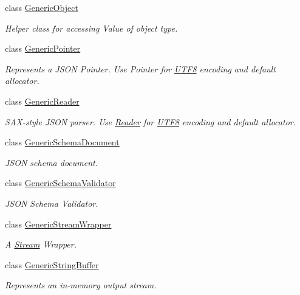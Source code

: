 \begin{DoxyCompactItemize}
class \mbox{\hyperlink{classrapidjson_1_1_generic_object}{Generic\+Object}}
\begin{DoxyCompactList}\small\item\em Helper class for accessing Value of object type. \end{DoxyCompactList}\item 
class \mbox{\hyperlink{classrapidjson_1_1_generic_pointer}{Generic\+Pointer}}
\begin{DoxyCompactList}\small\item\em Represents a J\+S\+ON Pointer. Use Pointer for \mbox{\hyperlink{structrapidjson_1_1_u_t_f8}{U\+T\+F8}} encoding and default allocator. \end{DoxyCompactList}\item 
class \mbox{\hyperlink{classrapidjson_1_1_generic_reader}{Generic\+Reader}}
\begin{DoxyCompactList}\small\item\em S\+A\+X-\/style J\+S\+ON parser. Use \mbox{\hyperlink{namespacerapidjson_ad5310edd1226f5b3ea82dc0d4d3740c6}{Reader}} for \mbox{\hyperlink{structrapidjson_1_1_u_t_f8}{U\+T\+F8}} encoding and default allocator. \end{DoxyCompactList}\item 
class \mbox{\hyperlink{classrapidjson_1_1_generic_schema_document}{Generic\+Schema\+Document}}
\begin{DoxyCompactList}\small\item\em J\+S\+ON schema document. \end{DoxyCompactList}\item 
class \mbox{\hyperlink{classrapidjson_1_1_generic_schema_validator}{Generic\+Schema\+Validator}}
\begin{DoxyCompactList}\small\item\em J\+S\+ON Schema Validator. \end{DoxyCompactList}\item 
class \mbox{\hyperlink{classrapidjson_1_1_generic_stream_wrapper}{Generic\+Stream\+Wrapper}}
\begin{DoxyCompactList}\small\item\em A \mbox{\hyperlink{classrapidjson_1_1_stream}{Stream}} Wrapper. \end{DoxyCompactList}\item 
class \mbox{\hyperlink{classrapidjson_1_1_generic_string_buffer}{Generic\+String\+Buffer}}
\begin{DoxyCompactList}\small\item\em Represents an in-\/memory output stream. \end{DoxyCompactList}\item 

\end{DoxyCompactItemize}
